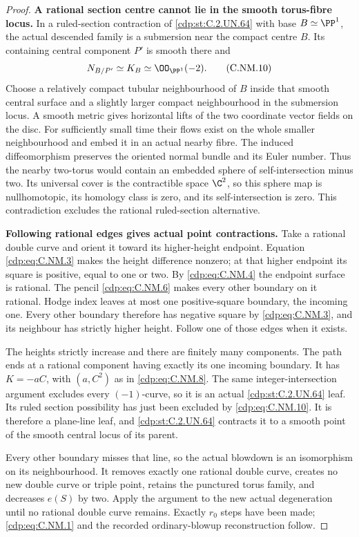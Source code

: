 \begin{proof}
\par\medskip\noindent\textbf{A rational section centre cannot lie in the smooth torus-fibre locus.}
In a ruled-section contraction of \ref{cdp:st:C.2.UN.64} with base
$B\simeq\PP^1$, the actual descended family is a
submersion near the compact centre $B$. Its containing
central component $P'$ is smooth there and
\[
                    N_{B/P'}\simeq K_B\simeq\OO_{\PP^1}(-2).
\tag{C.NM.10}\label{cdp:eq:C.NM.10}
\]
Choose a relatively compact tubular neighbourhood of
$B$ inside that smooth central surface and a slightly
larger compact neighbourhood in the submersion locus.
A smooth metric gives horizontal lifts of the two
coordinate vector fields on the disc. For sufficiently
small time their flows exist on the whole smaller
neighbourhood and embed it in an actual nearby fibre.
The induced diffeomorphism preserves the oriented
normal bundle and its Euler number. Thus the nearby
two-torus would contain an embedded sphere of
self-intersection minus two. Its universal cover is
the contractible space $\C^2$, so this sphere map is
nullhomotopic, its homology class is zero, and its
self-intersection is zero. This contradiction excludes
the rational ruled-section alternative.

\par\medskip\noindent\textbf{Following rational edges gives actual point contractions.}
Take a rational double curve and orient it toward its
higher-height endpoint. Equation \eqref{cdp:eq:C.NM.3} makes the
height difference nonzero; at that higher endpoint
its square is positive, equal to one or two. By
\eqref{cdp:eq:C.NM.4} the endpoint surface is rational. The pencil
\eqref{cdp:eq:C.NM.6} makes every other boundary on it rational.
Hodge index leaves at most one positive-square
boundary, the incoming one. Every other boundary
therefore has negative square by \eqref{cdp:eq:C.NM.3}, and its
neighbour has strictly higher height. Follow one
of those edges when it exists.

The heights strictly increase and there are finitely
many components. The path ends at a rational
component having exactly its one incoming boundary.
It has $K=-aC$, with $(a,C^2)$ as in \eqref{cdp:eq:C.NM.8}.
The same integer-intersection argument excludes every
$(-1)$-curve, so it is an actual \ref{cdp:st:C.2.UN.64} leaf. Its ruled
section possibility has just been excluded by
\eqref{cdp:eq:C.NM.10}. It is therefore a plane-line leaf, and
\ref{cdp:st:C.2.UN.64} contracts it to a smooth point of the smooth
central locus of its parent.

Every other boundary misses that line, so the actual
blowdown is an isomorphism on its neighbourhood.
It removes exactly one rational double curve, creates
no new double curve or triple point, retains the
punctured torus family, and decreases $e(S)$ by two.
Apply the argument to the new actual degeneration
until no rational double curve remains. Exactly
$r_0$ steps have been made; \eqref{cdp:eq:C.NM.1} and the recorded
ordinary-blowup reconstruction follow.
\end{proof}


